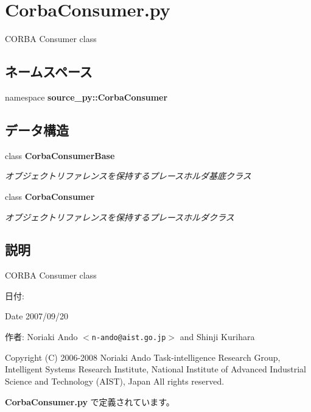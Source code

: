 \section{CorbaConsumer.py}
\label{_corba_consumer_8py}
CORBA Consumer class 

\subsection*{ネームスペース}
\begin{CompactItemize}
\item 
namespace \textbf{source\_\-py::CorbaConsumer}
\end{CompactItemize}
\subsection*{データ構造}
\begin{CompactItemize}
\item 
class {\bf CorbaConsumerBase}
\begin{CompactList}\small\item\em オブジェクトリファレンスを保持するプレースホルダ基底クラス \item\end{CompactList}\item 
class {\bf CorbaConsumer}
\begin{CompactList}\small\item\em オブジェクトリファレンスを保持するプレースホルダクラス \item\end{CompactList}\end{CompactItemize}


\subsection{説明}
CORBA Consumer class 

\begin{Desc}
\item[日付:]\end{Desc}
\begin{Desc}
\item[Date]2007/09/20 \end{Desc}
\begin{Desc}
\item[作者:]Noriaki Ando $<${\tt n-ando@aist.go.jp}$>$ and Shinji Kurihara\end{Desc}
Copyright (C) 2006-2008 Noriaki Ando Task-intelligence Research Group, Intelligent Systems Research Institute, National Institute of Advanced Industrial Science and Technology (AIST), Japan All rights reserved. 

 {\bf CorbaConsumer.py} で定義されています。